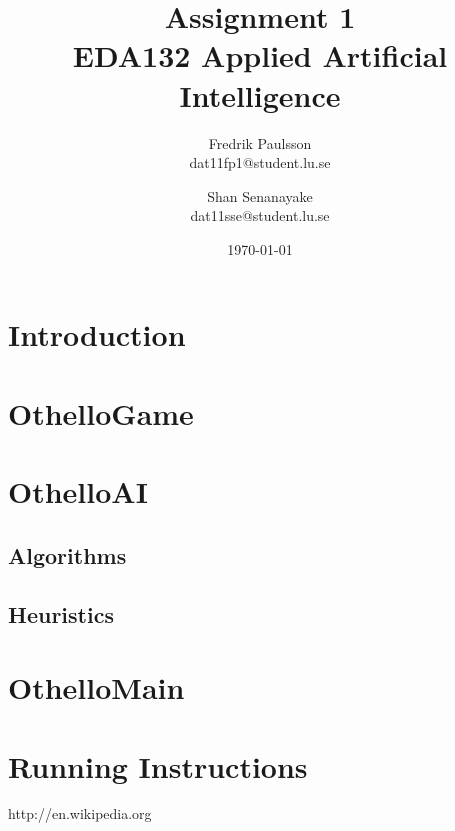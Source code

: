 \documentclass[a4paper]{article}
\title{Assignment 1 \\ EDA132 Applied Artificial Intelligence}
\date{\today}
\author{Fredrik Paulsson \\ dat11fp1@student.lu.se \and Shan Senanayake \\ dat11sse@student.lu.se}
\begin{document}
\maketitle


\section{Introduction}

\section{OthelloGame}

\section{OthelloAI}

\subsection{Algorithms}

\subsection{Heuristics}

\section{OthelloMain}

\section{Running Instructions}


\begin{thebibliography}{1}
http://en.wikipedia.org
\end{thebibliography}
\end{document}
